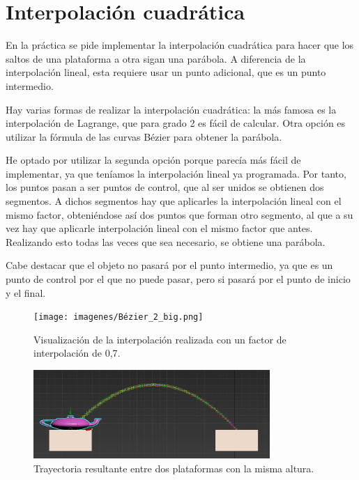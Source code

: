 \section{Interpolación cuadrática}

En la práctica se pide implementar la interpolación cuadrática para hacer que los saltos de una plataforma a otra sigan una parábola. A diferencia de la interpolación lineal, esta requiere usar un punto adicional, que es un punto intermedio.

\bigskip

Hay varias formas de realizar la interpolación cuadrática: la más famosa es la interpolación de Lagrange, que para grado 2 es fácil de calcular. Otra opción es utilizar la fórmula de las curvas Bézier para obtener la parábola.

\bigskip

He optado por utilizar la segunda opción porque parecía más fácil de implementar, ya que teníamos la interpolación lineal ya programada. Por tanto, los puntos pasan a ser puntos de control, que al ser unidos se obtienen dos segmentos. A dichos segmentos hay que aplicarles la interpolación lineal con el mismo factor, obteniéndose así dos puntos que forman otro segmento, al que a su vez hay que aplicarle interpolación lineal con el mismo factor que antes. Realizando esto todas las veces que sea necesario, se obtiene una parábola.

\bigskip

Cabe destacar que el objeto no pasará por el punto intermedio, ya que es un punto de control por el que no puede pasar, pero si pasará por el punto de inicio y el final.

\begin{figure}[H]
   \centering
   \texttt{[image: imagenes/Bézier\_2\_big.png]}
   \caption{Visualización de la interpolación realizada con un factor de interpolación de 0,7\cite{enwiki:1153684109}.}
\end{figure}

\begin{figure}[H]
    \centering
    \includegraphics[width=0.8\textwidth]{imagenes/motion path.png}
    \caption{Trayectoria resultante entre dos plataformas con la misma altura.}
 \end{figure}